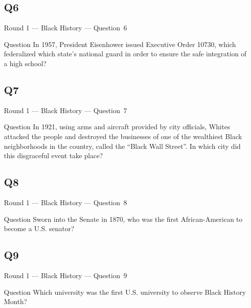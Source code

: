 \documentclass[11pt]{beamer}
\begin{document}
\subsection*{Q6}
\begin{frame}[t]{Round 1 --- Black History --- \mbox{Question 6}}
\vspace{-0.5em}
\begin{block}{Question}
In 1957, President Eisenhower issued Executive Order 10730, which federalized which state's national guard in order to ensure the safe integration of a high school?
\end{block}
\end{frame}
\subsection*{Q7}
\begin{frame}[t]{Round 1 --- Black History --- \mbox{Question 7}}
\vspace{-0.5em}
\begin{block}{Question}
In 1921, using arms and aircraft provided by city officials, Whites attacked the people and destroyed the businesses of one of the wealthiest Black neighborhoods in the country, called the ``Black Wall Street''. In which city did this disgraceful event take place?
\end{block}
\end{frame}
\subsection*{Q8}
\begin{frame}[t]{Round 1 --- Black History --- \mbox{Question 8}}
\vspace{-0.5em}
\begin{block}{Question}
Sworn into the Senate in 1870, who was the first African-American to become a U.S. senator?
\end{block}
\end{frame}
\subsection*{Q9}
\begin{frame}[t]{Round 1 --- Black History --- \mbox{Question 9}}
\vspace{-0.5em}
\begin{block}{Question}
Which university was the first U.S. university to observe Black History Month?
\end{block}
\end{frame}
\end{document}
